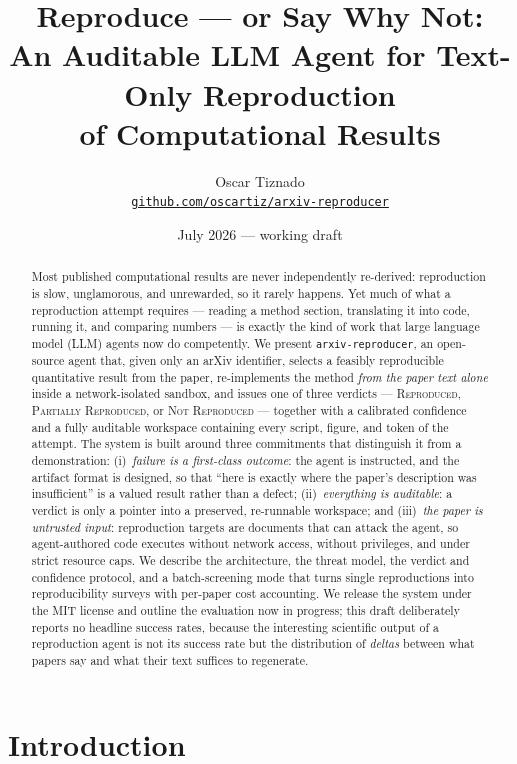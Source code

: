 \documentclass[10pt]{article}
\title{Reproduce --- or Say Why Not:\\
An Auditable LLM Agent for Text-Only Reproduction\\
of Computational Results}
\author{Oscar Tiznado\\
\small\href{https://github.com/oscartiz/arxiv-reproducer}{\texttt{github.com/oscartiz/arxiv-reproducer}}}
\date{July 2026 --- working draft}
\newcommand{\system}{\texttt{arxiv-reproducer}}
\newcommand{\verdict}[1]{\textsc{#1}}
\begin{document}
\maketitle

\begin{abstract}
Most published computational results are never independently re-derived: reproduction is slow, unglamorous, and unrewarded, so it rarely happens. Yet much of what a reproduction attempt requires --- reading a method section, translating it into code, running it, and comparing numbers --- is exactly the kind of work that large language model (LLM) agents now do competently. We present \system{}, an open-source agent that, given only an arXiv identifier, selects a feasibly reproducible quantitative result from the paper, re-implements the method \emph{from the paper text alone} inside a network-isolated sandbox, and issues one of three verdicts --- \verdict{Reproduced}, \verdict{Partially Reproduced}, or \verdict{Not Reproduced} --- together with a calibrated confidence and a fully auditable workspace containing every script, figure, and token of the attempt. The system is built around three commitments that distinguish it from a demonstration: (i)~\emph{failure is a first-class outcome}: the agent is instructed, and the artifact format is designed, so that ``here is exactly where the paper's description was insufficient'' is a valued result rather than a defect; (ii)~\emph{everything is auditable}: a verdict is only a pointer into a preserved, re-runnable workspace; and (iii)~\emph{the paper is untrusted input}: reproduction targets are documents that can attack the agent, so agent-authored code executes without network access, without privileges, and under strict resource caps. We describe the architecture, the threat model, the verdict and confidence protocol, and a batch-screening mode that turns single reproductions into reproducibility surveys with per-paper cost accounting. We release the system under the MIT license and outline the evaluation now in progress; this draft deliberately reports no headline success rates, because the interesting scientific output of a reproduction agent is not its success rate but the distribution of \emph{deltas} between what papers say and what their text suffices to regenerate.
\end{abstract}

\section{Introduction}
\end{document}
